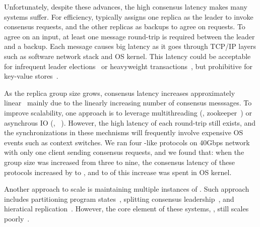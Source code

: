 Unfortunately, despite these advances, the high \paxos consensus latency makes
many systems suffer. For efficiency, \paxos typically assigns one replica as
the leader to invoke consensus requests, and the other replicas as backups to
agree on requests. To agree on an input, at least one message round-trip is
required between the leader and a backup. Each message causes big latency as it
goes through TCP/IP layers such as software network stack and OS kernel. This
latency could be acceptable for infrequent
leader elections~\cite{chubby:osdi,zookeeper} or
heavyweight transactions~\cite{crane:sosp15,eve:osdi12}, but prohibitive for
key-value stores~\cite{redis,memcached}.


As the replica group size grows, \paxos consensus latency increases
approximately linear~\cite{scatter:sosp11} mainly due to the linearly
increasing number of consensus messsages. To improve scalability, one approach
is to leverage multithreading (\eg, zookeeper~\cite{zookeeper}) or asynchrous
IO (\eg, \crane~\cite{crane:sosp15}). However, the high latency of each
round-trip still exists, and the synchronizations in these mechnisms will
frequently involve expensive OS events such as context switches. We ran four
\paxos-like protocols on 40Gbps network with only one client sending consensus
requests, and we found that: when the group size was increased from three to
nine, the consensus latency of these protocols increased by
\tradlatencyincreaselow to \tradlatencyincreasehigh, and \systemcostlow to
\systemcosthigh of this increase was spent in OS kernel.

Another approach to scale \paxos is maintaining multiple instances of \paxos.
Such approach includes partitioning program
states~\cite{scatter:sosp11,dssmr,ssmr}, splitting consensus
leadership~\cite{mencius:osdi08,spaxos}, and hieratical
replication~\cite{manos:hotdep10,scatter:sosp11}. However, the core element of
these systems, \paxos, still scales
poorly~\cite{ellis:thesis,scatter:sosp11,manos:hotdep10}.

